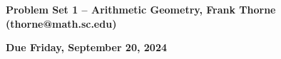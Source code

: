 \documentclass[12pt]{article}
\begin{document}
\newcommand\Hom{\operatorname{Hom}}
\newcommand\Aut{\operatorname{Aut}}
\newcommand\Out{\operatorname{Out}}
\newcommand\Vol{\operatorname{Vol}}
\newcommand\Covol{\operatorname{Covol}}
\newcommand\C{\mathbb{C}}
\newcommand\F{\mathbb{F}}
\newcommand\Q{\mathbb{Q}}
\newcommand\R{\mathbb{R}}
\newcommand\Z{\mathbb{Z}}
\newcommand\Disc{\operatorname{Disc}}
\newcommand\disc{\operatorname{Disc}}
\newcommand\im{\operatorname{im}}
\newcommand\ord{\operatorname{ord}}

\setlength{\topmargin}{-2mm}





\begin{center}{\bf Problem Set 1 -- Arithmetic Geometry, Frank Thorne (thorne@math.sc.edu)}
\end{center}
\begin{center}
{\bf Due Friday, September 20, 2024}
\end{center}
\end{document}
